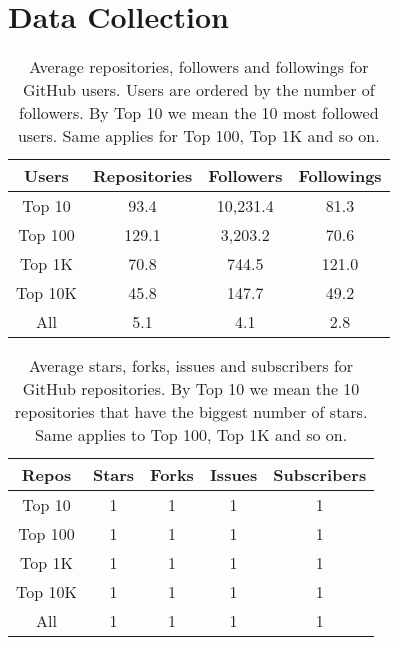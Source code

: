 
\section{Data Collection}
\label{sec:collection}
\begin{table}
\centering
\begin{tabular}{ | c | c | c | c | }
	\hline
	Users & Repositories & Followers & Followings \\ \hline
	Top 10 & 93.4 & 10,231.4 & 81.3 \\ \hline
	Top 100 & 129.1 & 3,203.2 & 70.6 \\ \hline
	Top 1K & 70.8 & 744.5 & 121.0 \\ \hline
	Top 10K & 45.8 & 147.7 & 49.2 \\ \hline
	All & 5.1 & 4.1 & 2.8 \\ \hline
\end{tabular}
\caption{Average repositories, followers and followings for GitHub users. Users are ordered by the number of followers. By Top 10 we mean the 10 most followed users. Same applies for Top 100, Top 1K and so on.}
\label{tbl:topusers}
\end{table}
\begin{table}
\centering
\begin{tabular}{ | c | c | c | c | c | }
	\hline
	Repos & Stars & Forks & Issues & Subscribers \\ \hline
	Top 10 & 1 & 1 & 1 & 1 \\ \hline
	Top 100 & 1 & 1 & 1 & 1 \\ \hline
	Top 1K & 1 & 1 & 1 & 1 \\ \hline
	Top 10K & 1 & 1 & 1 & 1 \\ \hline
	All & 1 & 1 & 1 & 1 \\ \hline
\end{tabular}
\caption{Average stars, forks, issues and subscribers for GitHub repositories. By Top 10 we mean the 10 repositories that have the biggest number of stars. Same applies to Top 100, Top 1K and so on.}
\label{tbl:toprepos}
\end{table}
